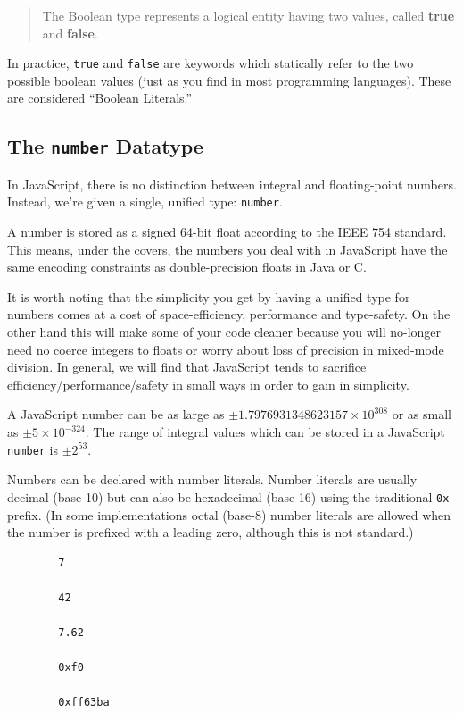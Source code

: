 \documentclass[11pt,letter]{book}
\begin{document}
    \begin{quote}
        The Boolean type represents a logical entity having two values, called \textbf{true}
        and \textbf{false}.
    \end{quote}
    
    In practice, \texttt{true} and \texttt{false} are keywords which  statically refer to the two 
    possible boolean values (just as you find in most programming languages). These are considered 
    ``Boolean Literals.''
    
    \subsection{The \texttt{number} Datatype}
    In JavaScript, there is no distinction between integral and floating-point numbers. Instead, 
    we're given a single, unified type: \texttt{number}.
    
    A number is stored as a signed 64-bit float according to the IEEE 754 standard. This means, 
    under the covers, the numbers you deal with in JavaScript have the same encoding constraints as 
    double-precision floats in Java or C.
    
    It is worth noting that the simplicity you get by having a unified type for numbers comes at 
    a cost of space-efficiency, performance and type-safety. On the other hand this will make 
    some of your code cleaner because you will no-longer need no coerce integers to floats or 
    worry about loss of precision in mixed-mode division. In general, we will find that 
    JavaScript tends to sacrifice efficiency/performance/safety in small ways in order to gain 
    in simplicity.
    
    A JavaScript number can be as large as $\pm 1.7976931348623157 \times 10^{308}$ or as small as
    $\pm 5 \times 10^{-324}$. The range of integral values which can be stored in a JavaScript 
    \texttt{number} is $\pm 2^{53}$.
    
    Numbers can be declared with number literals. Number literals are usually decimal (base-10) but 
    can also be hexadecimal (base-16) using the traditional \texttt{0x} prefix. (In some 
    implementations octal (base-8) number literals are allowed when the number is prefixed with a 
    leading zero, although this is not standard.)
    
    \begin{verbatim}
        7
    
        42
        
        7.62
        
        0xf0
    
        0xff63ba
    \end{verbatim}
    
\end{document}
